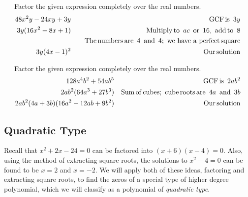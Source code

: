 \begin{example}~~~Factor the given expression completely over the real numbers.
  \begin{eqnarray*}
    48 x^2 y - 24 x y + 3 y &  & \operatorname{GCF} \operatorname{is~} 3 y\\
    3 y (16 x^2 - 8 x + 1) &  & \operatorname{Multiply} \operatorname{to~}ac \operatorname{~or~} 16, \operatorname{~add}
    \operatorname{to~} 8\\
    &  &~~~ \operatorname{The} \operatorname{numbers} \operatorname{are~} 4 \operatorname{~and~} 4; \operatorname{~we~have~a~perfect} \operatorname{square}\\
    3 y (4 x - 1)^2 &  & \operatorname{Our} \operatorname{solution}
  \end{eqnarray*}
\end{example}

\begin{example}~~~Factor the given expression completely over the real numbers.
  \begin{eqnarray*}
    128 a^4 b^2 + 54 a b^5 &  & \operatorname{GCF} \operatorname{is~} 2 a b^2\\
    2 a b^2 (64 a^3 + 27 b^3) &  & \operatorname{Sum} \operatorname{of} \operatorname{cubes}; \operatorname{~cube} \operatorname{roots} \operatorname{are~} 4 a \operatorname{~and~} 3 b\\
    2 ab^2 (4 a + 3 b) (16 a^2 - 12 a b + 9 b^2) &  & \operatorname{Our}
    \operatorname{solution}
  \end{eqnarray*}
\end{example}
\newpage

\subsection{Quadratic Type}

{}
\pp

Recall that $x^2+2x-24=0$ can be factored into $(x+6)(x-4)=0$.  Also, using the method of extracting square roots, the solutions to $x^2-4=0$ can be found to be $x=2$ and $x=-2$.  We will apply both of these ideas, factoring and extracting square roots, to find the zeros of a special type of higher degree polynomial, which we will classify as a polynomial of \textit{quadratic type}.\pp

